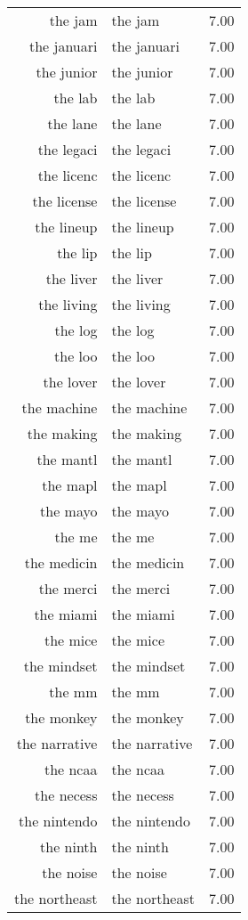 \begin{table}[ht]
\begin{tabular}{rlr}
  the jam & the jam & 7.00 \\ 
  the januari & the januari & 7.00 \\ 
  the junior & the junior & 7.00 \\ 
  the lab & the lab & 7.00 \\ 
  the lane & the lane & 7.00 \\ 
  the legaci & the legaci & 7.00 \\ 
  the licenc & the licenc & 7.00 \\ 
  the license & the license & 7.00 \\ 
  the lineup & the lineup & 7.00 \\ 
  the lip & the lip & 7.00 \\ 
  the liver & the liver & 7.00 \\ 
  the living & the living & 7.00 \\ 
  the log & the log & 7.00 \\ 
  the loo & the loo & 7.00 \\ 
  the lover & the lover & 7.00 \\ 
  the machine & the machine & 7.00 \\ 
  the making & the making & 7.00 \\ 
  the mantl & the mantl & 7.00 \\ 
  the mapl & the mapl & 7.00 \\ 
  the mayo & the mayo & 7.00 \\ 
  the me & the me & 7.00 \\ 
  the medicin & the medicin & 7.00 \\ 
  the merci & the merci & 7.00 \\ 
  the miami & the miami & 7.00 \\ 
  the mice & the mice & 7.00 \\ 
  the mindset & the mindset & 7.00 \\ 
  the mm & the mm & 7.00 \\ 
  the monkey & the monkey & 7.00 \\ 
  the narrative & the narrative & 7.00 \\ 
  the ncaa & the ncaa & 7.00 \\ 
  the necess & the necess & 7.00 \\ 
  the nintendo & the nintendo & 7.00 \\ 
  the ninth & the ninth & 7.00 \\ 
  the noise & the noise & 7.00 \\ 
  the northeast & the northeast & 7.00 \\ 

\end{tabular}
\end{table}
